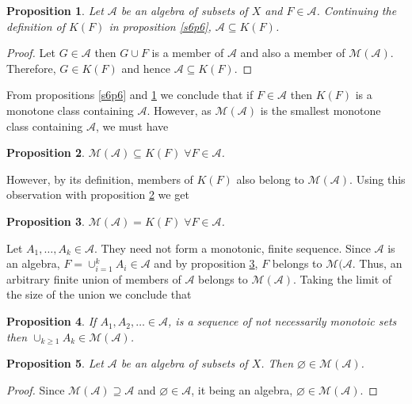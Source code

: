 \documentclass{article}
\theoremstyle{plain}
\numberwithin{thm}{section}
\theoremstyle{plain}
\newtheorem{prop}{Proposition}
\numberwithin{prop}{section}
\theoremstyle{definition}
\numberwithin{defn}{section}
\theoremstyle{remark}
\theoremstyle{plain}
\numberwithin{cor}{section}
\numberwithin{equation}{section}
\begin{document}
\begin{prop}\label{s6p7}
Let $\mathcal{A}$ be an algebra of subsets of $X$ and $F \in \mathcal{A}$. 
Continuing the definition of $K(F)$ in proposition \ref{s6p6}, $\mathcal{A}
\subseteq K(F)$.
\end{prop}
\begin{proof}
Let $G \in \mathcal{A}$ then $G \cup F$ is a member of $\mathcal{A}$ and also a
member of $\mathcal{M}(\mathcal{A})$. Therefore, $G \in K(F)$ and hence 
$\mathcal{A} \subseteq K(F)$.
\end{proof}

From propositions \ref{s6p6} and \ref{s6p7} we conclude that if $F \in 
\mathcal{A}$ then $K(F)$ is a monotone class containing $\mathcal{A}$. However,
as $\mathcal{M}(\mathcal{A})$ is the smallest monotone class containing 
$\mathcal{A}$, we must have
\begin{prop}\label{s6p8}
$\mathcal{M}(\mathcal{A}) \subseteq K(F) \;\forall F \in \mathcal{A}$.
\end{prop}

However, by its definition, members of $K(F)$ also belong to 
$\mathcal{M}(\mathcal{A})$. Using this observation with proposition \ref{s6p8}
we get
\begin{prop}\label{s6p9}
$\mathcal{M}(\mathcal{A}) = K(F) \;\forall F \in \mathcal{A}$.
\end{prop}

Let $A_1, \ldots, A_k \in \mathcal{A}$. They need not form a monotonic, finite
sequence. Since $\mathcal{A}$ is an algebra, $F = \cup_{i=1}^k A_i \in 
\mathcal{A}$ and by proposition \ref{s6p9}, $F$ belongs to $\mathcal{M}(
\mathcal{A}$. Thus, an arbitrary finite union of members of $\mathcal{A}$
belongs to $\mathcal{M}(\mathcal{A})$. Taking the limit of the size of the union
we conclude that
\begin{prop}\label{s6p10}
If $A_1, A_2, \ldots \in \mathcal{A}$, is a sequence of not necessarily monotoic
sets then $\cup_{k \ge 1}A_k \in  \mathcal{M}(\mathcal{A})$.
\end{prop}

\begin{prop}\label{s6p11}
Let $\mathcal{A}$ be an algebra of subsets of $X$. Then $\varnothing \in
\mathcal{M}(\mathcal{A})$.
\end{prop}
\begin{proof}
Since $\mathcal{M}(\mathcal{A}) \supseteq \mathcal{A}$ and $\varnothing \in
\mathcal{A}$, it being an algebra, $\varnothing \in \mathcal{M}(\mathcal{A})$.
\end{proof}
\end{document}

